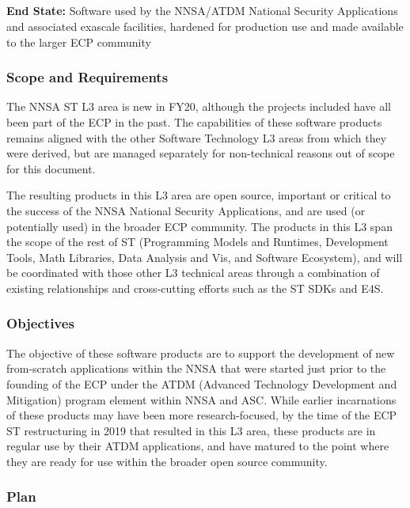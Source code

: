 \subsection{ \nnsa}\label{subsect:nnsa}

\textbf{End State:} Software used by the NNSA/ATDM National Security
Applications and associated exascale facilities, hardened for
production use and made available to the larger ECP community

\subsubsection{Scope and Requirements}
The NNSA ST L3 area is new in FY20, although the projects included
have all been part of the ECP in the past. The capabilities of these
software products remains aligned with the other Software Technology
L3 areas from which they were derived, but are managed separately for
non-technical reasons out of scope for this document.

The resulting products in this L3 area 
are open source, important or critical to the success of the NNSA
National Security Applications, and are used (or potentially used) in
the broader ECP community. The products in this L3 span the scope of
the rest of ST (Programming Models and Runtimes, Development Tools,
Math Libraries, Data Analysis and Vis, and Software Ecosystem), and
will be coordinated with those other L3 technical 
areas through a combination of existing relationships and
cross-cutting efforts such as the ST SDKs and E4S.  

\subsubsection{Objectives}

The objective of these software products are to support the
development of new from-scratch applications within the NNSA that were
started just prior to the founding of the ECP under the ATDM (Advanced
Technology Development and Mitigation) program element within NNSA and
ASC. While earlier incarnations of these products may have been more
research-focused, by the time of the ECP ST restructuring in 2019 that
resulted in this L3 area, these products are in regular use by their
ATDM applications, and have matured to the point where they are ready
for use within the broader open source community.

\subsubsection{Plan}

